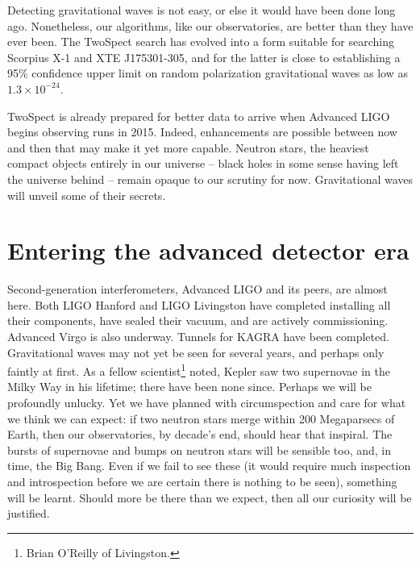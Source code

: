 Detecting gravitational waves is not easy, or else it would have been done long ago.
Nonetheless, our algorithms, like our observatories, are better than they have ever been.
The TwoSpect search has evolved into a form suitable for searching Scorpius X-1 and XTE J175301-305, and for the latter is close to establishing a 95\% confidence upper limit on random polarization gravitational waves as low as $1.3\times10^{-24}$. 

TwoSpect is already prepared for better data to arrive when Advanced LIGO begins observing runs in 2015.
Indeed, enhancements are possible between now and then that may make it yet more capable.
Neutron stars, the heaviest compact objects entirely in our universe -- black holes in some sense having left the universe behind -- remain opaque to our scrutiny for now.
Gravitational waves will unveil some of their secrets.

    \section{Entering the advanced detector era}
    \label{advanced_detector_era}


Second-generation interferometers, Advanced LIGO and its peers, are almost here. 
Both LIGO Hanford and LIGO Livingston have completed installing all their components, have sealed their vacuum, and are actively commissioning.
Advanced Virgo is also underway.
Tunnels for KAGRA have been completed.
Gravitational waves may not yet be seen for several years, and perhaps only faintly at first.
As a fellow scientist\footnote{Brian O'Reilly of Livingston.} noted, Kepler saw two supernovae in the Milky Way in his lifetime; there have been none since.
Perhaps we will be profoundly unlucky.
Yet we have planned with circumspection and care for what we think we can expect: if two neutron stars merge within 200 Megaparsecs of Earth, then our observatories, by decade's end, should hear that inspiral.
The bursts of supernovae and bumps on neutron stars will be sensible too, and, in time, the Big Bang.
Even if we fail to see these (it would require much inspection and introspection before we are certain there is nothing to be seen), something will be learnt.
Should more be there than we expect, then all our curiosity will be justified.

